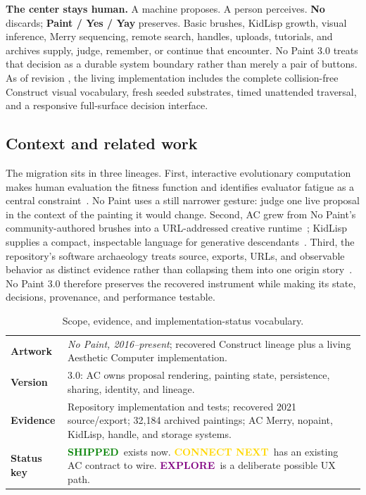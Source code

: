 \documentclass[10pt,letterpaper,twocolumn]{article}
\newcommand{\mono}[1]{\code{#1}}
\newcommand{\shipped}{\textcolor{Green}{\textbf{SHIPPED}}}
\newcommand{\nexttag}{\textcolor{Gold}{\textbf{CONNECT NEXT}}}
\newcommand{\explore}{\textcolor{Purple}{\textbf{EXPLORE}}}
\begin{document}
\textbf{The center stays human.} A machine proposes. A person perceives. \textbf{No} discards; \textbf{Paint / Yes / Yay} preserves. Basic brushes, KidLisp growth, visual inference, Merry sequencing, remote search, handles, uploads, tutorials, and archives supply, judge, remember, or continue that encounter. No Paint 3.0 treats that decision as a durable system boundary rather than merely a pair of buttons. As of revision \mono{4c4ba9448}, the living implementation includes the complete collision-free Construct visual vocabulary, fresh seeded substrates, timed unattended traversal, and a responsive full-surface decision interface.

\subsection{Context and related work}

The migration sits in three lineages. First, interactive evolutionary computation makes human evaluation the fitness function and identifies evaluator fatigue as a central constraint~\citep{sims1991,takagi2001}. No Paint uses a still narrower gesture: judge one live proposal in the context of the painting it would change. Second, AC grew from No Paint's community-authored brushes into a URL-addressed creative runtime~\citep{scudder2026ac}; KidLisp supplies a compact, inspectable language for generative descendants~\citep{scudder2026kidlisp}. Third, the repository's software archaeology treats source, exports, URLs, and observable behavior as distinct evidence rather than collapsing them into one origin story~\citep{scudder2026archaeology}. No Paint 3.0 therefore preserves the recovered instrument while making its state, decisions, provenance, and performance testable.

\begin{table}[t]
\caption{Scope, evidence, and implementation-status vocabulary.}
\begin{tabularx}{\textwidth}{@{}L{1.12in}Y@{}}
\textbf{Artwork} & \emph{No Paint, 2016--present}; recovered Construct lineage plus a living Aesthetic Computer implementation. \\
\textbf{Version} & 3.0: AC owns proposal rendering, painting state, persistence, sharing, identity, and lineage. \\
\textbf{Evidence} & Repository implementation and tests; recovered 2021 source/export; 32,184 archived paintings; AC Merry, nopaint, KidLisp, handle, and storage systems. \\
\textbf{Status key} & \shipped\ exists now. \nexttag\ has an existing AC contract to wire. \explore\ is a deliberate possible UX path. \\
\end{tabularx}
\end{table}
\end{document}
